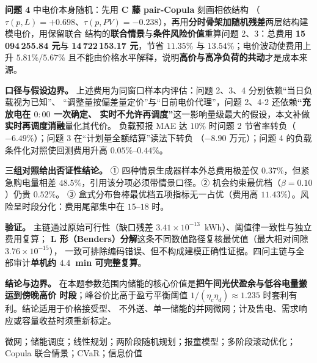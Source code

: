 {\textbf{问题 4} 中电价本身随机：先用 \textbf{C 藤 pair-Copula} 刻画相依结构
（\(\tau(p,L)=+0.698\)、\(\tau(p,PV)=-0.238\)），再用\textbf{分时骨架加随机残差}两层结构建模电价，用保留联合
结构的\textbf{联合情景}与\textbf{条件风险价值}重算问题 2、3：总费用 \textbf{15\,094\,255.84 元}与
\textbf{14\,722\,153.17 元}，节省 \(11.35\%\) 与 \(13.54\%\)；电价波动使费用上升 \(5.81\%/5.67\%\)
且不能由价格水平解释，说明\textbf{高价与高净负荷的共动}才是成本来源。

\textbf{口径与假设边界。} 上述费用为同窗口样本内评估：问题 2、3、4 分别依赖“当日负载视为已知”、
“调整量按偏差量定价”与“日前电价代理”，问题 2、4-2 还依赖\textbf{“充放电在 \(0{:}00\) 一次确定、
实时不允许再调度”}这一影响量级最大的假设，本文补做\textbf{实时再调度消融}量化其代价。
负载预报 MAE 达 \(10\%\) 时问题 2 节省率转负（\(-6.49\%\)）；问题 3 在“计划量全额结算”读法下转负
（\(-8.90\) 万元）；问题 4 的负载条件化对照使回测费用升高 \(0.05\%\)--\(0.44\%\)。

\textbf{三组对照给出否证性结论。} ① 四种情景生成器样本外总费用极差仅 \(0.37\%\)，但紧急购电量相差
\(48.5\%\)，引用该分项必须带情景口径。② 机会约束最优档（\(\beta=0.10\)）仍贵 \(0.52\%\)。
③ 盒式分布鲁棒最优档五项指标无一占优（费用高 \(11.43\%\)）。风险呈时段分化：费用尾部集中在
\(15\)--\(18\) 时。

\textbf{验证。} 主链通过原始可行性（缺口残差 \(3.41\times10^{-13}\)~kWh）、阈值律一致性与独立费用复算；
\textbf{L 形（Benders）分解}这条不同数值路径复核最优值（最大相对间隙 \(3.76\times10^{-15}\)），
一致可排除编码错误、但不构成建模正确性证据。四问主链与全部审计\textbf{单机约 \(4.4\)~min 可完整复算}。

\textbf{结论与边界。} 在本题参数范围内储能的核心价值是\textbf{把午间光伏盈余与低谷电量搬运到傍晚高价
时段}；峰谷价比高于盈亏平衡阈值 \(1/(\eta_c\eta_d)\approx1.235\) 时套利有利。结论适用于价格接受型、
不外送、单一储能的并网微网；计及售电、需求响应或容量收益时须重新标定。

\quad 微网；储能调度；线性规划；两阶段随机规划；报童模型；多阶段滚动优化；
Copula 联合情景；CVaR；信息价值
}
\newpage

